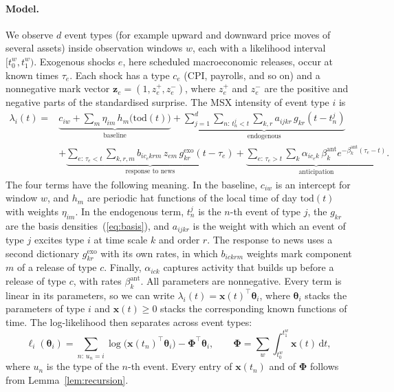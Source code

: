 \paragraph{Model.} We observe $d$ event types (for example upward and downward price moves of
several assets) inside observation windows $w$, each with a likelihood interval
$[t_0^w,t_1^w)$. Exogenous shocks $e$, here scheduled macroeconomic releases, occur at known times
$\tau_e$. Each shock has a type $c_e$ (CPI, payrolls, and so on) and a nonnegative mark vector
$\bm z_e=(1,z_e^+,z_e^-)$, where $z_e^+$ and $z_e^-$ are the positive and negative parts of the
standardised surprise. The MSX intensity of event type $i$ is
\begin{align}
\lambda_i(t)={}&\underbrace{c_{iw}+\sum_{m}\eta_{im}\,h_m\bigl(\mathrm{tod}(t)\bigr)}_{\text{baseline}}
+\underbrace{\sum_{j=1}^{d}\sum_{n:\,t_n^j<t}\sum_{k,r}a_{ijkr}\,g_{kr}(t-t_n^j)}_{\text{endogenous}}\nonumber\\
&+\underbrace{\sum_{e:\,\tau_e<t}\sum_{k,r,m}b_{i c_e k r m}\,z_{em}\,g^{\mathrm{exo}}_{kr}(t-\tau_e)}_{\text{response to news}}
+\underbrace{\sum_{e:\,\tau_e>t}\sum_{k}\alpha_{ic_ek}\,\beta^{\mathrm{ant}}_k e^{-\beta^{\mathrm{ant}}_k(\tau_e-t)}}_{\text{anticipation}} .
\label{eq:intensity}
\end{align}
The four terms have the following meaning. In the baseline, $c_{iw}$ is an intercept for window
$w$, and $h_m$ are periodic hat functions of the local time of day $\mathrm{tod}(t)$ with weights
$\eta_{im}$. In the endogenous term, $t_n^j$ is the $n$-th event of type $j$, the $g_{kr}$ are the
basis densities~(\ref{eq:basis}), and $a_{ijkr}$ is the weight with which an event of type $j$
excites type $i$ at time scale $k$ and order $r$. The response to news uses a second dictionary
$g^{\mathrm{exo}}_{kr}$ with its own rates, in which $b_{ickrm}$ weights mark component $m$ of a
release of type $c$. Finally, $\alpha_{ick}$ captures activity that builds up before a release of
type $c$, with rates $\beta^{\mathrm{ant}}_k$. All parameters are nonnegative. Every term is linear in its parameters, so we can write
$\lambda_i(t)=\bm x(t)^\top\bm\theta_i$, where $\bm\theta_i$ stacks the parameters of type $i$ and
$\bm x(t)\ge0$ stacks the corresponding known functions of time. The log-likelihood then
separates across event types:
\begin{equation}\label{eq:ll}
\ell_i(\bm\theta_i)=\sum_{n:\,u_n=i}\log\bigl(\bm x(t_n)^\top\bm\theta_i\bigr)-\bm\Phi^\top\bm\theta_i,
\qquad \bm\Phi=\sum_w\int_{t_0^w}^{t_1^w}\bm x(t)\,\mathrm{d}t ,
\end{equation}
where $u_n$ is the type of the $n$-th event. Every entry of $\bm x(t_n)$ and of $\bm\Phi$ follows
from Lemma~\ref{lem:recursion}.

